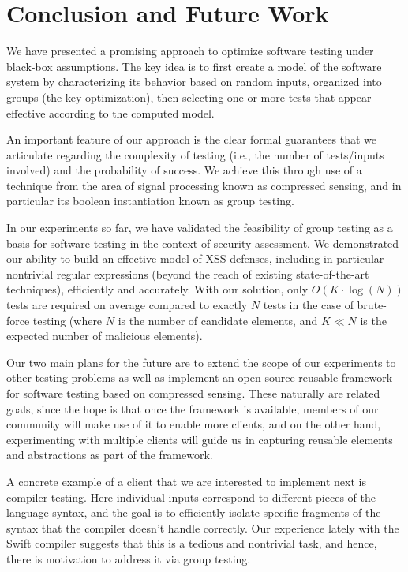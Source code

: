 \section{Conclusion and Future Work}

We have presented a promising approach to optimize software testing under black-box assumptions. The key idea is to first create a model of the software system by characterizing its behavior based on random inputs, organized into groups (the key optimization), then selecting one or more tests that appear effective according to the computed model.

An important feature of our approach is the clear formal guarantees that we articulate regarding the complexity of testing (i.e., the number of tests/inputs involved) and the probability of success. We achieve this through use of a technique from the area of signal processing known as compressed sensing, and in particular its boolean instantiation known as group testing.

In our experiments so far, we have validated the feasibility of group testing as a basis for software testing in the context of security assessment. We demonstrated our ability to build an effective model of XSS defenses, including in particular nontrivial regular expressions (beyond the reach of existing state-of-the-art techniques), efficiently and accurately. With our solution, only $O(K\cdot\log(N))$ tests are required on average compared to exactly $N$ tests in the case of brute-force testing (where $N$ is the number of candidate elements, and $K \ll N$ is the expected number of malicious elements).

Our two main plans for the future are to extend the scope of our experiments to other testing problems as well as implement an open-source reusable framework for software testing based on compressed sensing. These naturally are related goals, since the hope is that once the framework is available, members of our community will make use of it to enable more clients, and on the other hand, experimenting with multiple clients will guide us in capturing reusable elements and abstractions as part of the framework.

A concrete example of a client that we are interested to implement next is compiler testing. Here individual inputs correspond to different pieces of the language syntax, and the goal is to efficiently isolate specific fragments of the syntax that the compiler doesn't handle correctly. Our experience lately with the Swift compiler suggests that this is a tedious and nontrivial task, and hence, there is motivation to address it via group testing.